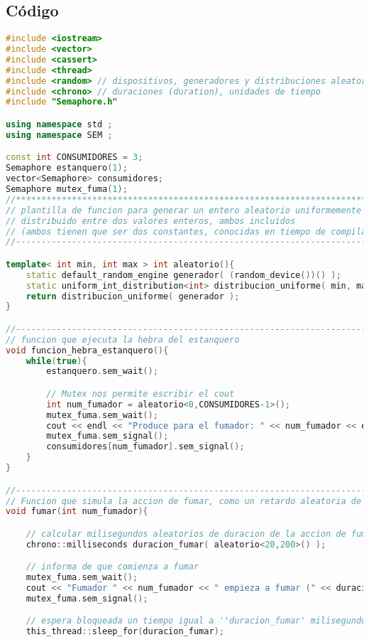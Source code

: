 \documentclass[8pt, a4paper, titlepage]{article}
\begin{document}
   		\subsection{Código}
   		\begin{lstlisting}[language=C++]
#include <iostream>
#include <vector>
#include <cassert>
#include <thread>
#include <random> // dispositivos, generadores y distribuciones aleatorias
#include <chrono> // duraciones (duration), unidades de tiempo
#include "Semaphore.h"

using namespace std ;
using namespace SEM ;

const int CONSUMIDORES = 3;
Semaphore estanquero(1);
vector<Semaphore> consumidores;
Semaphore mutex_fuma(1);
//**********************************************************************
// plantilla de funcion para generar un entero aleatorio uniformemente
// distribuido entre dos valores enteros, ambos incluidos
// (ambos tienen que ser dos constantes, conocidas en tiempo de compilacion)
//----------------------------------------------------------------------

template< int min, int max > int aleatorio(){
	static default_random_engine generador( (random_device())() );
	static uniform_int_distribution<int> distribucion_uniforme( min, max ) ;
	return distribucion_uniforme( generador );
}

//----------------------------------------------------------------------
// funcion que ejecuta la hebra del estanquero
void funcion_hebra_estanquero(){
	while(true){
		estanquero.sem_wait();

		// Mutex nos permite escribir el cout
		int num_fumador = aleatorio<0,CONSUMIDORES-1>();
		mutex_fuma.sem_wait();
		cout << endl << "Produce para el fumador: " << num_fumador << endl;
		mutex_fuma.sem_signal();
		consumidores[num_fumador].sem_signal();
	}
}

//-------------------------------------------------------------------------
// Funcion que simula la accion de fumar, como un retardo aleatoria de la hebra
void fumar(int num_fumador){

	// calcular milisegundos aleatorios de duracion de la accion de fumar)
	chrono::milliseconds duracion_fumar( aleatorio<20,200>() );

	// informa de que comienza a fumar
	mutex_fuma.sem_wait();
	cout << "Fumador " << num_fumador << " empieza a fumar (" << duracion_fumar.count() << " milisegundos)" << endl;
	mutex_fuma.sem_signal();

	// espera bloqueada un tiempo igual a ''duracion_fumar' milisegundos
	this_thread::sleep_for(duracion_fumar);


\end{lstlisting}
\end{document}
